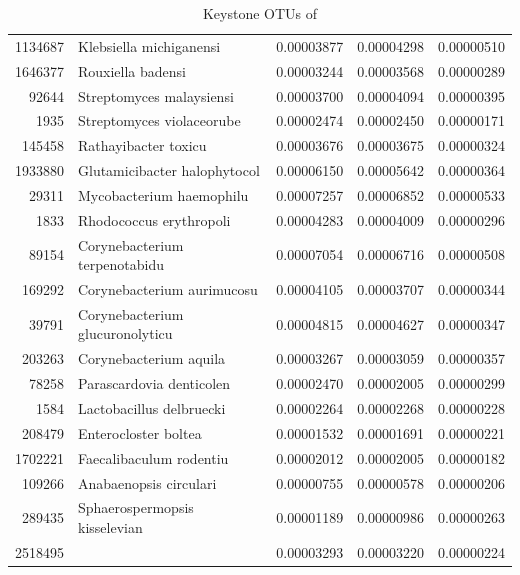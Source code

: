 \begin{table}[ht]
\begin{tabular}{rlrrr}
  1134687 & Klebsiella michiganensi & 0.00003877 & 0.00004298 & 0.00000510 \\ 
  1646377 & Rouxiella badensi & 0.00003244 & 0.00003568 & 0.00000289 \\ 
  92644 & Streptomyces malaysiensi & 0.00003700 & 0.00004094 & 0.00000395 \\ 
  1935 & Streptomyces violaceorube & 0.00002474 & 0.00002450 & 0.00000171 \\ 
  145458 & Rathayibacter toxicu & 0.00003676 & 0.00003675 & 0.00000324 \\ 
  1933880 & Glutamicibacter halophytocol & 0.00006150 & 0.00005642 & 0.00000364 \\ 
  29311 & Mycobacterium haemophilu & 0.00007257 & 0.00006852 & 0.00000533 \\ 
  1833 & Rhodococcus erythropoli & 0.00004283 & 0.00004009 & 0.00000296 \\ 
  89154 & Corynebacterium terpenotabidu & 0.00007054 & 0.00006716 & 0.00000508 \\ 
  169292 & Corynebacterium aurimucosu & 0.00004105 & 0.00003707 & 0.00000344 \\ 
  39791 & Corynebacterium glucuronolyticu & 0.00004815 & 0.00004627 & 0.00000347 \\ 
  203263 & Corynebacterium aquila & 0.00003267 & 0.00003059 & 0.00000357 \\ 
  78258 & Parascardovia denticolen & 0.00002470 & 0.00002005 & 0.00000299 \\ 
  1584 & Lactobacillus delbruecki & 0.00002264 & 0.00002268 & 0.00000228 \\ 
  208479 & Enterocloster boltea & 0.00001532 & 0.00001691 & 0.00000221 \\ 
  1702221 & Faecalibaculum rodentiu & 0.00002012 & 0.00002005 & 0.00000182 \\ 
  109266 & Anabaenopsis circulari & 0.00000755 & 0.00000578 & 0.00000206 \\ 
  289435 & Sphaerospermopsis kisselevian & 0.00001189 & 0.00000986 & 0.00000263 \\ 
  2518495 &   & 0.00003293 & 0.00003220 & 0.00000224 \\ 
   \hline
\end{tabular}
\caption{Keystone OTUs of } 
\end{table}
